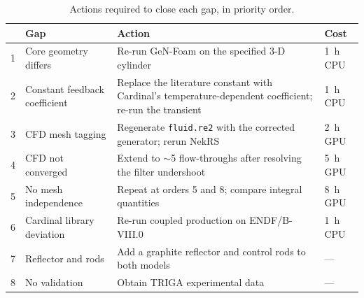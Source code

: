 \documentclass[11pt,a4paper]{article}
\begin{document}
\begin{table}[H]\centering\small
\caption{Actions required to close each gap, in priority order.}
\begin{tabular}{@{}rlp{58mm}l@{}}
\toprule
& \textbf{Gap} & \textbf{Action} & \textbf{Cost}\\
\midrule
1 & Core geometry differs & Re-run GeN-Foam on the specified 3-D cylinder & \SI{1}{\hour} CPU\\
2 & Constant feedback coefficient & Replace the literature constant with Cardinal's temperature-dependent coefficient; re-run the transient & \SI{1}{\hour} CPU\\
3 & CFD mesh tagging & Regenerate \texttt{fluid.re2} with the corrected generator; rerun NekRS & \SI{2}{\hour} GPU\\
4 & CFD not converged & Extend to $\sim$5 flow-throughs after resolving the filter undershoot & \SI{5}{\hour} GPU\\
5 & No mesh independence & Repeat at orders 5 and 8; compare integral quantities & \SI{8}{\hour} GPU\\
6 & Cardinal library deviation & Re-run coupled production on ENDF/B-VIII.0 & \SI{1}{\hour} CPU\\
7 & Reflector and rods & Add a graphite reflector and control rods to both models & ---\\
8 & No validation & Obtain TRIGA experimental data & ---\\
\bottomrule
\end{tabular}
\end{table}


\newpage
\end{document}
